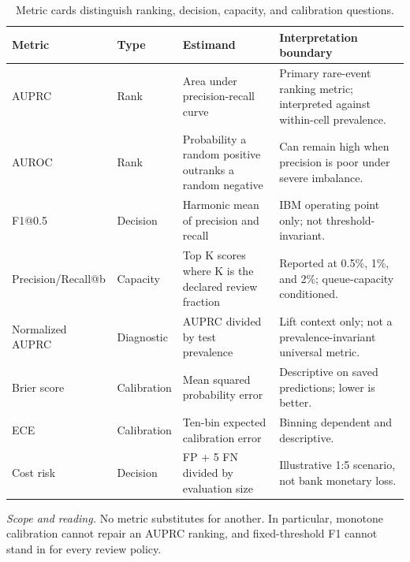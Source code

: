 \begin{table}[tbp]
\centering
\footnotesize
\setlength{\tabcolsep}{3.2pt}
\renewcommand{\arraystretch}{1.12}
\caption{Metric cards distinguish ranking, decision, capacity, and calibration questions.}
\label{tab:s-metric-cards}
\begin{tabularx}{\textwidth}{@{}>{\raggedright\arraybackslash}p{} >{\raggedright\arraybackslash}p{} Y Y@{}}
\toprule
\textbf{Metric} & \textbf{Type} & \textbf{Estimand} & \textbf{Interpretation boundary} \\
\midrule
AUPRC & Rank & Area under precision-recall curve & Primary rare-event ranking metric; interpreted against within-cell prevalence. \\
AUROC & Rank & Probability a random positive outranks a random negative & Can remain high when precision is poor under severe imbalance. \\
F1@0.5 & Decision & Harmonic mean of precision and recall & IBM operating point only; not threshold-invariant. \\
Precision/Recall@b & Capacity & Top K scores where K is the declared review fraction & Reported at 0.5\%, 1\%, and 2\%; queue-capacity conditioned. \\
Normalized AUPRC & Diagnostic & AUPRC divided by test prevalence & Lift context only; not a prevalence-invariant universal metric. \\
Brier score & Calibration & Mean squared probability error & Descriptive on saved predictions; lower is better. \\
ECE & Calibration & Ten-bin expected calibration error & Binning dependent and descriptive. \\
Cost risk & Decision & FP + 5 FN divided by evaluation size & Illustrative 1:5 scenario, not bank monetary loss. \\
\bottomrule
\end{tabularx}
\vspace{2pt}
\begin{minipage}{\textwidth}\footnotesize\emph{Scope and reading.} No metric substitutes for another. In particular, monotone calibration cannot repair an AUPRC ranking, and fixed-threshold F1 cannot stand in for every review policy.\end{minipage}
\end{table}
